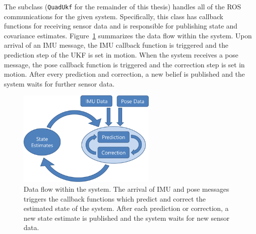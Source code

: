 The subclass (\texttt{QuadUkf} for the remainder of this thesis) handles all of the ROS communications for the given system. Specifically, this class has callback functions for receiving sensor data and is responsible for publishing state and covariance estimates. Figure~\ref{fig:data_flow} summarizes the data flow within the system. Upon arrival of an IMU message, the IMU callback function is triggered and the prediction step of the UKF is set in motion. When the system receives a pose message, the pose callback function is triggered and the correction step is set in motion. After every prediction and correction, a new belief is published and the system waits for further sensor data.

\begin{figure}
  \centering
    \includegraphics[width=0.6\textwidth]{data_flow}
  \caption[Data Flow Diagram]{Data flow within the system. The arrival of IMU and pose messages triggers the callback functions which predict and correct the estimated state of the system. After each prediction or correction, a new state estimate is published and the system waits for new sensor data.}
  \label{fig:data_flow}
\end{figure}
